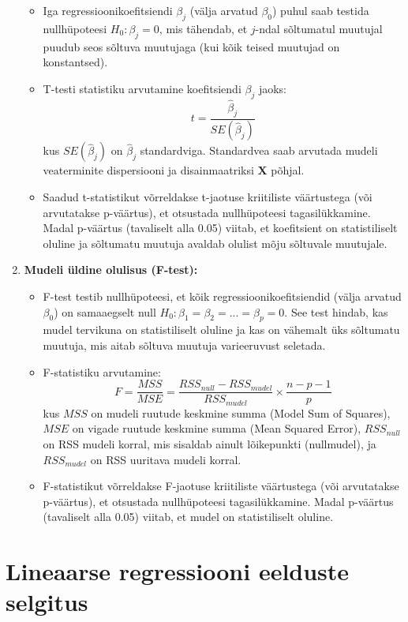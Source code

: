 \documentclass[
]{book}
\providecommand{\tightlist}{%
  \setlength{\itemsep}{0pt}\setlength{\parskip}{0pt}}
\begin{document}
\begin{enumerate}
  \begin{itemize}
  \tightlist
  \item
    Iga regressioonikoefitsiendi \(\beta_j\) (välja arvatud \(\beta_0\)) puhul saab testida nullhüpoteesi \(H_0: \beta_j = 0\), mis tähendab, et \(j\)-ndal sõltumatul muutujal puudub seos sõltuva muutujaga (kui kõik teised muutujad on konstantsed).
  \item
    T-testi statistiku arvutamine koefitsiendi \(\beta_j\) jaoks:
    \[t = \frac{\hat{\beta}_j}{SE(\hat{\beta}_j)}\]
    kus \(SE(\hat{\beta}_j)\) on \(\hat{\beta}_j\) standardviga. Standardvea saab arvutada mudeli veaterminite dispersiooni ja disainmaatriksi \(\mathbf{X}\) põhjal.
  \item
    Saadud t-statistikut võrreldakse t-jaotuse kriitiliste väärtustega (või arvutatakse p-väärtus), et otsustada nullhüpoteesi tagasilükkamine. Madal p-väärtus (tavaliselt alla 0.05) viitab, et koefitsient on statistiliselt oluline ja sõltumatu muutuja avaldab olulist mõju sõltuvale muutujale.
  \end{itemize}
\item
  \textbf{Mudeli üldine olulisus (F-test):}

  \begin{itemize}
  \tightlist
  \item
    F-test testib nullhüpoteesi, et kõik regressioonikoefitsiendid (välja arvatud \(\beta_0\)) on samaaegselt null \(H_0: \beta_1 = \beta_2 = ... = \beta_p = 0\). See test hindab, kas mudel tervikuna on statistiliselt oluline ja kas on vähemalt üks sõltumatu muutuja, mis aitab sõltuva muutuja varieeruvust seletada.
  \item
    F-statistiku arvutamine:
    \[F = \frac{MSS}{MSE} = \frac{RSS_{null} - RSS_{mudel}}{RSS_{mudel}} \times \frac{n-p-1}{p}\]
    kus \(MSS\) on mudeli ruutude keskmine summa (Model Sum of Squares), \(MSE\) on vigade ruutude keskmine summa (Mean Squared Error), \(RSS_{null}\) on RSS mudeli korral, mis sisaldab ainult lõikepunkti (nullmudel), ja \(RSS_{mudel}\) on RSS uuritava mudeli korral.
  \item
    F-statistikut võrreldakse F-jaotuse kriitiliste väärtustega (või arvutatakse p-väärtus), et otsustada nullhüpoteesi tagasilükkamine. Madal p-väärtus (tavaliselt alla 0.05) viitab, et mudel on statistiliselt oluline.
  \end{itemize}
\end{enumerate}

\section{Lineaarse regressiooni eelduste selgitus}\label{lineaarse-regressiooni-eelduste-selgitus}
\end{document}
